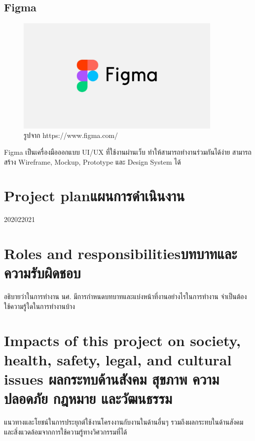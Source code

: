 \subsection{Figma}
\begin{figure}[H]
  \centering
  \includegraphics[width=100mm, keepaspectratio ]{pictures/Figma.jpg}
  \caption[Figma]{รูปจาก https://www.figma.com/}
  \label{fig:figma}
\end{figure}
\hspace{1.27cm} Figma เป็นเครื่องมือออกแบบ UI/UX ที่ใช้งานผ่านเว็บ ทำให้สามารถทำงานร่วมกันได้ง่าย สามารถสร้าง Wireframe, Mockup, Prototype และ Design System ได้
\section{\ifenglish Project plan\else แผนการดำเนินงาน\fi}

\begin{plan}{6}{2020}{2}{2021}
\end{plan}

\section{\ifenglish Roles and responsibilities\else บทบาทและความรับผิดชอบ\fi}
อธิบายว่าในการทำงาน นศ. มีการกำหนดบทบาทและแบ่งหน้าที่งานอย่างไรในการทำงาน จำเป็นต้องใช้ความรู้ใดในการทำงานบ้าง

\section{\ifenglish%
Impacts of this project on society, health, safety, legal, and cultural issues
\else%
ผลกระทบด้านสังคม สุขภาพ ความปลอดภัย กฎหมาย และวัฒนธรรม
\fi}

แนวทางและโยชน์ในการประยุกต์ใช้งานโครงงานกับงานในด้านอื่นๆ รวมถึงผลกระทบในด้านสังคมและสิ่งแวดล้อมจากการใช้ความรู้ทางวิศวกรรมที่ได้
